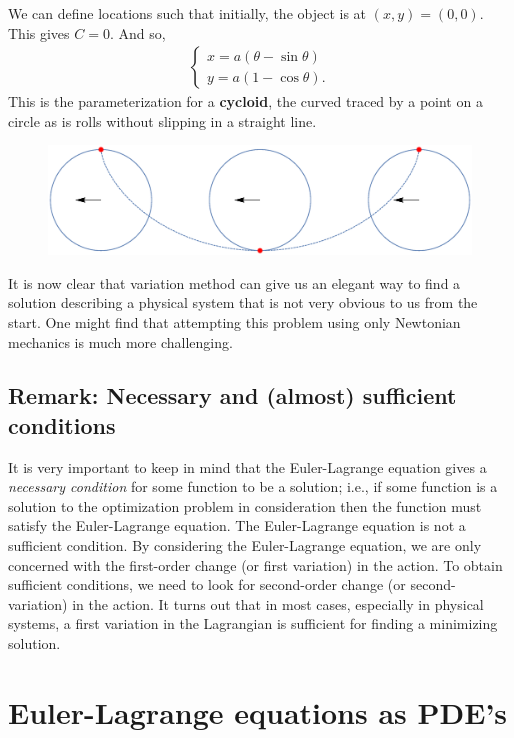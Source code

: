 \documentclass{article}
\begin{document}
We can define locations such that initially, the object is at $(x,y) = (0,0)$. This gives $C = 0$. And so,
\begin{align}
\begin{cases}
x = a(\theta - \sin\theta)\\
y = a(1-\cos\theta).
\end{cases}
\end{align}
This is the parameterization for a \textbf{cycloid}, the curved traced by a point on a circle as is rolls without slipping in a straight line. \\

\begin{figure}[h!]
	\centering
	\includegraphics[scale=0.35, angle=180]{cycloid.eps}
\end{figure}

It is now clear that variation method can give us an elegant way to find a solution describing a physical system that is not very obvious to us from the start. One might find that attempting this problem using only Newtonian mechanics is much more challenging. 


\subsection{Remark: Necessary and (almost) sufficient conditions}
It is very important to keep in mind that the Euler-Lagrange equation gives a \textit{necessary condition} for some function to be a solution; i.e., if some function is a solution to the optimization problem in consideration then the function must satisfy the Euler-Lagrange equation. The Euler-Lagrange equation is not a sufficient condition\cite{CVAR}. By considering the Euler-Lagrange equation, we are only concerned with the first-order change (or first variation) in the action. To obtain sufficient conditions, we need to look for second-order change (or second-variation) in the action. It turns out that in most cases, especially in physical systems, a first variation in the Lagrangian is sufficient for finding a minimizing solution. \cite{FARLOW} 


\section{Euler-Lagrange equations as PDE's}
\end{document}
